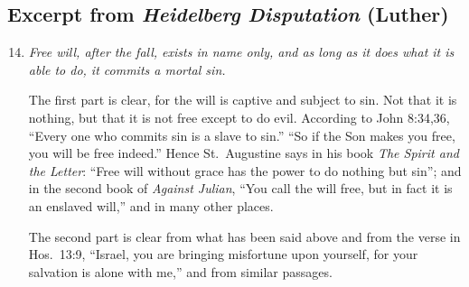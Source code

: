 \documentclass[10pt,article,twoside]{memoir}
\begin{document}
\begin{multicols}{2}

	\section{Excerpt from \emph{Heidelberg Disputation} (Luther)}
	\begin{enumerate}
		\setcounter{enumi}{13}
		\item \emph{Free will, after the fall, exists in name only, and as long as it does what it is able to do, it commits a mortal sin.}
		
		The first part is clear, for the will is captive and subject to sin. Not that it is nothing, but that it is not free except to do evil. According to John 8:34,36, ``Every one who commits sin is a slave to sin.'' ``So if the Son makes you free, you will be free indeed.'' Hence St.~Augustine says in his book \emph{The Spirit and the Letter}: ``Free will without grace has the power to do nothing but sin''; and in the second book of \emph{Against Julian}, ``You call the will free, but in fact it is an enslaved will,'' and in many other places.
		
		The second part is clear from what has been said above and from the verse in Hos.~13:9, ``Israel, you are bringing misfortune upon yourself, for your salvation is alone with me,'' and from similar passages.
		
		

\end{enumerate}
\end{multicols}
\end{document}
